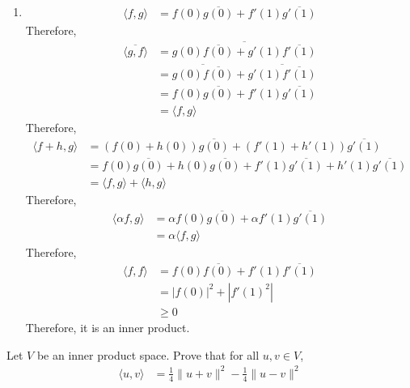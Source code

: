 \documentclass[fleqn, a4paper, 11pt, oneside]{amsart}
\theoremstyle{definition}
\theoremstyle{theorem}
\begin{document}
\begin{solution}
\begin{enumerate}[leftmargin=*]
		\item
			\begin{align*}
				\langle f,g \rangle & = f(0) \overline{g(0)} + f'(1) \overline{g'(1)}
			\end{align*}
			Therefore,
			\begin{align*}
				\overline{\langle g,f \rangle} & = \overline{g(0) \overline{f(0)} + g'(1) \overline{f'(1)}}            \\
                                                               & = \overline{g(0) \overline{f(0)}} + \overline{g'(1) \overline{f'(1)}} \\
                                                               & = f(0) \overline{g(0)} + f'(1) \overline{g'(1)}                       \\
                                                               & = \langle f,g \rangle
			\end{align*}
			Therefore,
			\begin{align*}
				\langle f + h , g \rangle & = \left( f(0) + h(0) \right) \overline{g(0)} + \left( f'(1) + h'(1) \right) \overline{g'(1)}    \\
                                                          & = f(0) \overline{g(0)} + h(0) \overline{g(0)} + f'(1) \overline{g'(1)} + h'(1) \overline{g'(1)} \\
                                                          & = \langle f,g \rangle + \langle h,g \rangle
			\end{align*}
			Therefore,
			\begin{align*}
				\langle \alpha f , g \rangle & = \alpha f(0) \overline{g(0)} + \alpha f'(1) \overline{g'(1)} \\
                                                             & = \alpha \langle f,g \rangle
			\end{align*}
			Therefore,
			\begin{align*}
				\langle f,f \rangle & = f(0) \overline{f(0)} + f'(1) \overline{f'(1)}  \\
                                                    & = \left| f(0) \right|^2 + \left| f'(1)^2 \right| \\
                                                    & \ge 0
			\end{align*}
			Therefore, it is an inner product.
	\end{enumerate}
\end{solution}

\begin{question}
	Let $V$ be an inner product space.
	Prove that for all $u,v \in V$,
	\begin{align*}
		\langle u,v \rangle & = \frac{1}{4} \|u + v\|^2 - \frac{1}{4} \|u - v\|^2
	\end{align*}
\end{question}
\end{document}
